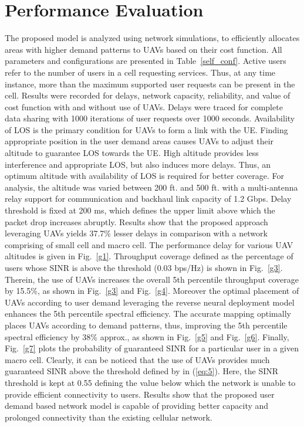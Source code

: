 \documentclass[journal]{IEEEtran}
\begin{document}
\section{Performance Evaluation}
The proposed model is analyzed using network simulations, to efficiently allocates areas with higher demand patterns to UAVs based on their cost function. All parameters and configurations are presented in Table~\ref{self_conf}. Active users refer to the number of users in a cell requesting services. Thus, at any time instance, more than the maximum supported user requests can be present in the cell. Results were recorded for delays, network capacity, reliability, and value of cost function with and without use of UAVs. Delays were traced for complete data sharing with 1000 iterations of user requests over 1000 seconds. Availability of LOS is the primary condition for UAVs to form a link with the UE. Finding appropriate position in the user demand areas causes UAVs to adjust their altitude to guarantee LOS towards the UE. High altitude provides less interference and appropriate LOS, but also induces more delays. Thus, an optimum altitude with availability of LOS is required for better coverage. For analysis, the altitude was varied between 200 ft. and 500 ft. with a multi-antenna relay support for communication and backhaul link capacity of 1.2 Gbps. Delay threshold is fixed at 200 ms, which defines the upper limit above which the packet drop increases abruptly. Results show that the proposed approach leveraging UAVs yields 37.7\% lesser delays in comparison with a network comprising of small cell and macro cell. The performance delay for various UAV altitudes is given in Fig.~\ref{g1}. Throughput coverage defined as the percentage of users whose SINR is above the threshold (0.03 bps/Hz) is shown in Fig.~\ref{g3}. Therein, the use of UAVs increases the overall 5th percentile throughput coverage by 15.5\%, as shown in Fig.~\ref{g3} and Fig.~\ref{g4}. Moreover the optimal placement of UAVs according to user demand leveraging the reverse neural deployment model enhances the 5th percentile spectral efficiency. The accurate mapping optimally places UAVs according to demand patterns, thus, improving the 5th percentile spectral efficiency by 38\% approx., as shown in Fig.~\ref{g5} and Fig.~\ref{g6}. Finally, Fig.~\ref{g7} plots the probability of guaranteed SINR for a particular user in a given macro cell. Clearly, it can be noticed that the use of UAVs provides much guaranteed SINR above the threshold defined by  in (\ref{eq:5}). Here, the SINR threshold is kept at 0.55 defining the value below which the network is unable to provide efficient connectivity to users. Results show that the proposed user demand based network model is capable of providing better capacity and prolonged connectivity than the existing cellular network.
\end{document}
